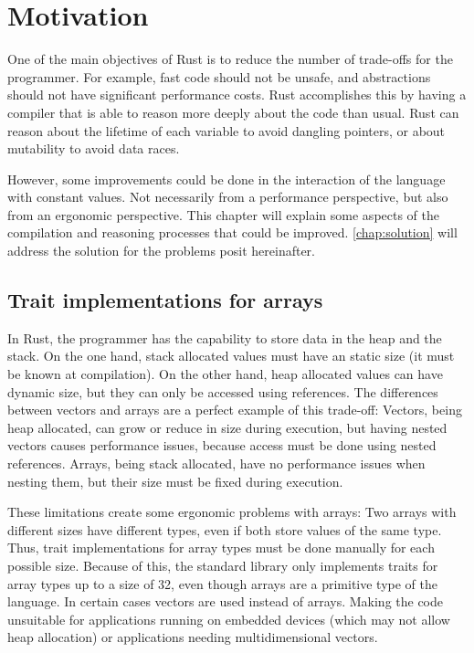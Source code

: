 \chapter{Motivation}
One of the main objectives of Rust is to reduce the number of trade-offs for
the programmer. For example, fast code should not be unsafe, and abstractions
should not have significant performance costs. Rust accomplishes this by having
a compiler that is able to reason more deeply about the code than usual. Rust
can reason about the lifetime of each variable to avoid dangling pointers, or
about mutability to avoid data races. 

However, some improvements could be done in the interaction of the language
with constant values. Not necessarily from a performance perspective, but also
from an ergonomic perspective. This chapter will explain some aspects of the
compilation and reasoning processes that could be improved.
\ref{chap:solution} will address the solution for the problems
posit hereinafter.

\label{chap:motivation}
\section{Trait implementations for arrays}
In Rust, the programmer has the capability to store data in the heap and the
stack. On the one hand, stack allocated values must have an static size (it
must be known at compilation). On the other hand, heap allocated values can
have dynamic size, but they can only be accessed using references. The
differences between vectors and arrays are a perfect example of this trade-off:
Vectors, being heap allocated, can grow or reduce in size during execution, but
having nested vectors causes performance issues, because access must be done
using nested references. Arrays, being stack allocated, have no performance
issues when nesting them, but their size must be fixed during execution.

These limitations create some ergonomic problems with arrays: Two arrays with
different sizes have different types, even if both store values of the same
type. Thus, trait implementations for array types must be done manually for
each possible size. Because of this, the standard library only implements
traits for array types up to a size of 32, even though arrays are a primitive
type of the language. In certain cases vectors are used instead of arrays.
Making the code unsuitable for applications running on embedded devices (which
may not allow heap allocation) or applications needing multidimensional
vectors.

